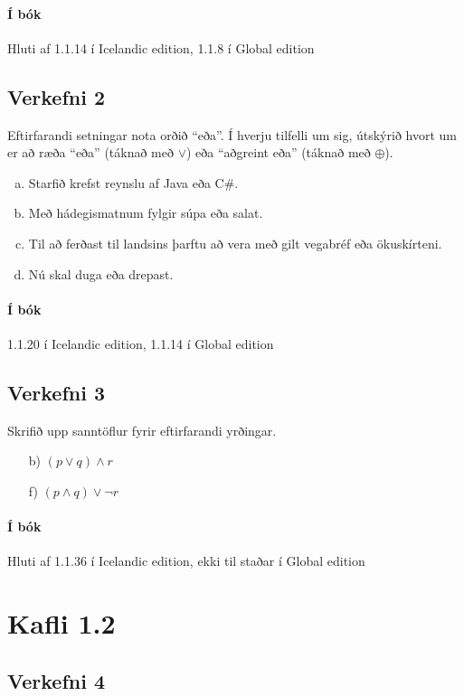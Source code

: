 \documentclass{article}
\begin{document}
\paragraph{Í bók} Hluti af 1.1.14 í Icelandic edition, 1.1.8 í Global edition
\newpage
\subsection{Verkefni 2} 
Eftirfarandi setningar nota orðið ``eða''. Í hverju tilfelli um sig, útskýrið hvort um er að ræða ``eða'' (táknað með $\lor$) eða ``aðgreint eða'' (táknað með $\oplus$).

\begin{enumerate}[a)]
 \item Starfið krefst reynslu af Java eða C\#.
 \item Með hádegismatnum fylgir súpa eða salat.
 \item Til að ferðast til landsins þarftu að vera með gilt vegabréf eða ökuskírteni.
 \item Nú skal duga eða drepast.
\end{enumerate}

\paragraph{Í bók} 1.1.20 í Icelandic edition, 1.1.14 í Global edition

\subsection{Verkefni 3} 
Skrifið upp sanntöflur fyrir eftirfarandi yrðingar.
\begin{itemize}
\item[b)] $(p \lor  q) \land     r$
\item[f)] $(p \land q) \lor \neg r$
\end{itemize}

\paragraph{Í bók} Hluti af 1.1.36 í Icelandic edition, ekki til staðar í Global edition

\section{Kafli 1.2}

\subsection{Verkefni 4}
\end{document}
